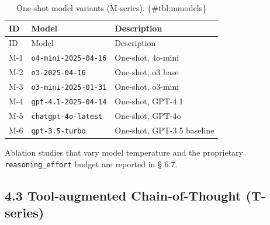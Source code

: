 \documentclass[
  11pt,
]{article}
\begin{document}
\begin{longtable}[]{@{}
  >{\raggedright\arraybackslash}p{}
  >{\raggedright\arraybackslash}p{}
  >{\raggedright\arraybackslash}p{}@{}}
\caption{One-shot model variants (M-series).
\{\#tbl:mmodels\}}\tabularnewline
\toprule\noalign{}
\begin{minipage}[b]{\linewidth}\raggedright
ID
\end{minipage} & \begin{minipage}[b]{\linewidth}\raggedright
Model
\end{minipage} & \begin{minipage}[b]{\linewidth}\raggedright
Description
\end{minipage} \\
\midrule\noalign{}
\endfirsthead
\toprule\noalign{}
\begin{minipage}[b]{\linewidth}\raggedright
ID
\end{minipage} & \begin{minipage}[b]{\linewidth}\raggedright
Model
\end{minipage} & \begin{minipage}[b]{\linewidth}\raggedright
Description
\end{minipage} \\
\midrule\noalign{}
\endhead
\bottomrule\noalign{}
\endlastfoot
M-1 & \texttt{o4-mini-2025-04-16} & One-shot, 4o-mini \\
M-2 & \texttt{o3-2025-04-16} & One-shot, o3 base \\
M-3 & \texttt{o3-mini-2025-01-31} & One-shot, o3-mini \\
M-4 & \texttt{gpt-4.1-2025-04-14} & One-shot, GPT-4.1 \\
M-5 & \texttt{chatgpt-4o-latest} & One-shot, GPT-4o \\
M-6 & \texttt{gpt-3.5-turbo} & One-shot, GPT-3.5 baseline \\
\end{longtable}

Ablation studies that vary model temperature and the proprietary
\texttt{reasoning\_effort} budget are reported in § 6.7.

\subsection{4.3 Tool-augmented Chain-of-Thought
(T-series)}\label{tool-augmented-chain-of-thought-t-series}
\end{document}
